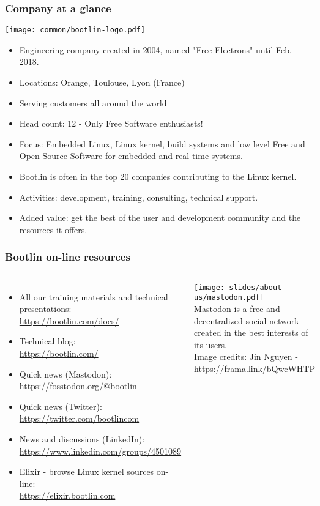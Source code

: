 \begin{frame}
\frametitle{Company at a glance}
  \texttt{[image: common/bootlin-logo.pdf]}
  \begin{itemize}
    \item Engineering company created in 2004, named "Free Electrons" until Feb. 2018.
    \item Locations: Orange, Toulouse, Lyon (France)
    \item Serving customers all around the world
    \item Head count: 12 - Only Free Software enthusiasts!
    \item Focus: Embedded Linux, Linux kernel,
          build systems and low level Free and Open Source Software
          for embedded and real-time systems.
    \item Bootlin is often in the top 20 companies
	  contributing to the Linux kernel.
    \item Activities: development, training, consulting, technical
          support.
    \item Added value: get the best of the user and development
          community and the resources it offers.
  \end{itemize}
\end{frame}

\begin{frame}
\frametitle{Bootlin on-line resources}
\begin{columns}
  \begin{itemize}
    \item All our training materials and technical presentations:\\
          \url{https://bootlin.com/docs/}
    \item Technical blog:\\
          \url{https://bootlin.com/}
    \item Quick news (Mastodon):\\
          \url{https://fosstodon.org/@bootlin}
    \item Quick news (Twitter):\\
          \url{https://twitter.com/bootlincom}
    \item News and discussions (LinkedIn):\\
	  \url{https://www.linkedin.com/groups/4501089}
    \item Elixir - browse Linux kernel sources on-line:\\
          \url{https://elixir.bootlin.com}
  \end{itemize}
  \texttt{[image: slides/about-us/mastodon.pdf]}\\
  \vspace{3cm}
  \small Mastodon is a free and decentralized social network created
  in the best interests of its users.\\
  \vspace{0.5cm}
  \tiny Image credits: Jin Nguyen - \url{https://frama.link/bQwcWHTP}
\end{columns}
\end{frame}
